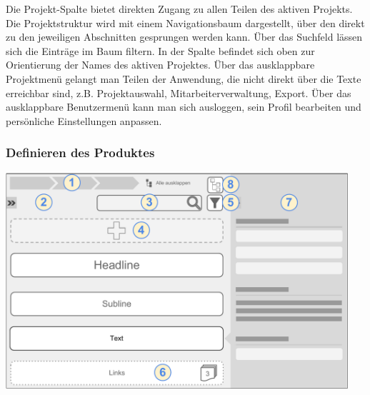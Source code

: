 Die Projekt-Spalte  bietet direkten Zugang zu allen Teilen des aktiven Projekts. Die Projektstruktur wird mit einem Navigationsbaum dargestellt, über den direkt zu den jeweiligen Abschnitten gesprungen werden kann. Über das Suchfeld lässen sich die Einträge im Baum filtern. In der Spalte befindet sich oben zur Orientierung der Names des aktiven Projektes. Über das ausklappbare Projektmenü gelangt man Teilen der Anwendung, die nicht direkt über die Texte erreichbar sind, z.B. Projektauswahl, Mitarbeiterverwaltung, Export. Über das ausklappbare Benutzermenü kann man sich ausloggen, sein Profil bearbeiten und persönliche Einstellungen anpassen.

\subsubsection{Definieren des Produktes}\label{l:gui-definition}

\begin{center}
\includegraphics[width=0.95\textwidth]{media/GUIProduktstruktur.pdf}
\label{chart:gui-produktstruktur}
\end{center}

